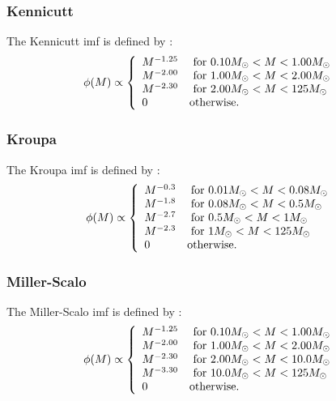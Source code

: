 \subsubsection{Kennicutt}

The {\normalfont \ttfamily Kennicutt} \gls{imf} is defined by \citep{kennicutt_rate_1983}:
\begin{equation}
 \phi(M) \propto \left\{ \begin{array}{ll}
 M^{-1.25} & \hbox{ for } 0.10M_\odot < M < 1.00M_\odot \\
 M^{-2.00} & \hbox{ for } 1.00M_\odot < M < 2.00M_\odot \\
 M^{-2.30} & \hbox{ for } 2.00M_\odot < M < 125M_\odot \\
 0 & \hbox {otherwise.} \end{array} \right.
\end{equation}

\subsubsection{Kroupa}

The {\normalfont \ttfamily Kroupa} \gls{imf} is defined by \citep{kroupa_variation_2001}:
\begin{equation}
 \phi(M) \propto \left\{ \begin{array}{ll}
 M^{-0.3} & \hbox{ for } 0.01M_\odot < M < 0.08M_\odot \\ 
 M^{-1.8} & \hbox{ for } 0.08M_\odot < M < 0.5M_\odot \\ 
 M^{-2.7} & \hbox{ for } 0.5M_\odot < M < 1M_\odot \\ 
 M^{-2.3} & \hbox{ for } 1M_\odot < M < 125M_\odot \\ 
0 & \hbox {otherwise.} \end{array} \right.
\end{equation}

\subsubsection{Miller-Scalo}

The {\normalfont \ttfamily Miller-Scalo} \gls{imf} is defined by \citep{miller_initial_1979}:
\begin{equation}
 \phi(M) \propto \left\{ \begin{array}{ll}
 M^{-1.25} & \hbox{ for } 0.10M_\odot < M < 1.00M_\odot \\
 M^{-2.00} & \hbox{ for } 1.00M_\odot < M < 2.00M_\odot \\
 M^{-2.30} & \hbox{ for } 2.00M_\odot < M < 10.0M_\odot \\
 M^{-3.30} & \hbox{ for } 10.0M_\odot < M < 125M_\odot \\
 0 & \hbox {otherwise.} \end{array} \right.
\end{equation}

